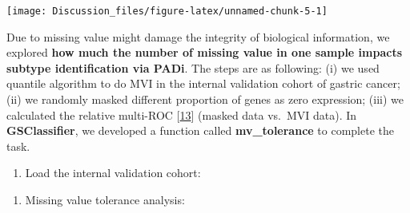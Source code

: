\documentclass[
  12pt,
]{book}
\newenvironment{Shaded}{\begin{snugshade}}{\end{snugshade}}
\newcommand{\AttributeTok}[1]{\textcolor[rgb]{0.77,0.63,0.00}{#1}}
\newcommand{\CommentTok}[1]{\textcolor[rgb]{0.56,0.35,0.01}{\textit{#1}}}
\newcommand{\DecValTok}[1]{\textcolor[rgb]{0.00,0.00,0.81}{#1}}
\newcommand{\FloatTok}[1]{\textcolor[rgb]{0.00,0.00,0.81}{#1}}
\newcommand{\FunctionTok}[1]{\textcolor[rgb]{0.00,0.00,0.00}{#1}}
\newcommand{\NormalTok}[1]{#1}
\newcommand{\OtherTok}[1]{\textcolor[rgb]{0.56,0.35,0.01}{#1}}
\newcommand{\SpecialCharTok}[1]{\textcolor[rgb]{0.00,0.00,0.00}{#1}}
\newcommand{\StringTok}[1]{\textcolor[rgb]{0.31,0.60,0.02}{#1}}
\providecommand{\tightlist}{%
  \setlength{\itemsep}{0pt}\setlength{\parskip}{0pt}}
\begin{document}
\begin{center}\texttt{[image: Discussion\_files/figure-latex/unnamed-chunk-5-1]} \end{center}

Due to missing value might damage the integrity of biological information, we explored \textbf{how much the number of missing value in one sample impacts subtype identification via PADi}. The steps are as following: (i) we used quantile algorithm to do MVI in the internal validation cohort of gastric cancer; (ii) we randomly masked different proportion of genes as zero expression; (iii) we calculated the relative multi-ROC {[}\protect\hyperlink{ref-pROC}{13}{]} (masked data vs.~MVI data). In \textbf{GSClassifier}, we developed a function called \textbf{mv\_tolerance} to complete the task.

\begin{enumerate}
\def\labelenumi{(\roman{enumi})}
\tightlist
\item
  Load the internal validation cohort:
\end{enumerate}

\begin{Shaded}
\end{Shaded}

\begin{enumerate}
\def\labelenumi{(\roman{enumi})}
\setcounter{enumi}{1}
\tightlist
\item
  Missing value tolerance analysis:
\end{enumerate}
\end{document}
